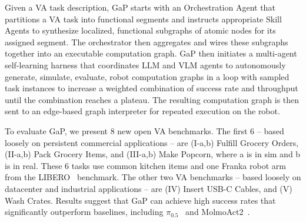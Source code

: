 Given a VA task description, GaP starts with an Orchestration Agent that partitions a VA task into functional segments and instructs appropriate Skill Agents to synthesize localized, functional subgraphs of atomic nodes for its assigned segment. The orchestrator then aggregates and wires these subgraphs together into an executable computation graph.  GaP then initiates a multi-agent self-learning harness that coordinates LLM and VLM agents to autonomously generate, simulate, evaluate, robot computation graphs in a loop with sampled task instances to increase a weighted combination of success rate and throughput until the combination reaches a plateau.  The resulting computation graph is then sent to an edge-based graph interpreter for repeated execution on the robot.    

 


To evaluate GaP, we present 8 new open VA benchmarks. The first 6 -- based loosely on persistent commercial applications -- are (I-a,b) Fulfill Grocery Orders, (II-a,b) Pack Grocery Items, and (III-a,b) Make Popcorn, where a is in sim and b is in real. These 6 tasks use common kitchen items and one Franka robot arm from the LIBERO~\cite{liu2023libero} benchmark. The other two VA benchmarks -- based loosely on datacenter and industrial applications -- are (IV) Insert USB-C Cables, and (V) Wash Crates. Results suggest that GaP can achieve high success rates that significantly outperform baselines, including $\pi_{0.5}$~\cite{black2025pi_} and MolmoAct2~\cite{fang2026molmoact2}.

